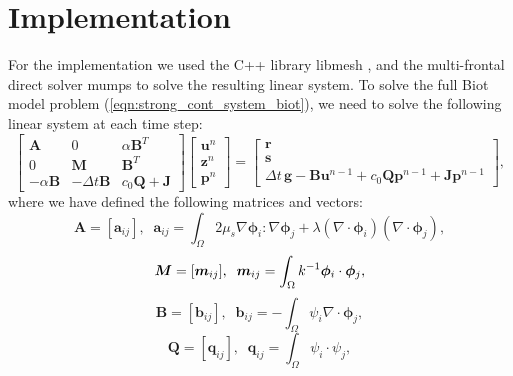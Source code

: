  \section{Implementation}
For the implementation we used the C++ library libmesh \citep{kirk2007libmesh}, and the multi-frontal direct solver mumps \citep{amestoy2000multifrontal} to solve the resulting linear system. To solve the full Biot model problem (\ref{eqn:strong_cont_system_biot}), we need to solve the following linear system at each time step:
 \begin{equation*}
 \begin{bmatrix}
  \mathbf{A} & 0 & \alpha\mathbf{B}^{T} \\
  0 & \mathbf{M} & \mathbf{B}^{T} \\
 - \alpha \mathbf{B} & -\Delta t \mathbf{B} & c_{0}\mathbf{Q} +\mathbf{J}
 \end{bmatrix}
 \begin{bmatrix}
  \mathbf{u}^{n} \\
  \mathbf{z}^{n} \\
 \mathbf{p}^{n}
 \end{bmatrix}=
 \begin{bmatrix}
  \mathbf{r} \\
  \mathbf{s} \\
  \Delta t \, \mathbf{g} - \mathbf{B} \mathbf{u}^{n-1} + c_{0}\mathbf{Q}\mathbf{p}^{n-1} + \mathbf{J} \mathbf{p}^{n-1} 
 \end{bmatrix},
 \end{equation*}
 where we have defined the following matrices and vectors:
 \begin{equation*}
  \mathbf{A}=[\mathbf{a}_{ij}], \;\; \mathbf{a}_{ij}=\int_{\Omega}2\mu_{s} \nabla \mathbf{\phi}_{i} : \nabla\mathbf{\phi}_{j} + \lambda (\nabla\cdot \mathbf{\phi}_{i}) (\nabla\cdot \mathbf{\phi}_{j}),
 \end{equation*}
 \begin{equation*}
  \boldsymbol{M}=[\boldsymbol{m}_{ij}], \;\; \boldsymbol{m}_{ij}=\int_{\Omega}{k^{-1}}  \boldsymbol{\phi}_{i} \cdot \boldsymbol{\phi}_{j}, 
 \end{equation*}
\begin{equation*}
  \mathbf{B}=[\mathbf{b}_{ij}], \;\; \mathbf{b}_{ij}=-\int_{\Omega}  {\psi}_{i} \nabla \cdot \mathbf{\phi}_{j} ,
 \end{equation*}
 \begin{equation*}
  \mathbf{Q}=[\mathbf{q}_{ij}], \;\; \mathbf{q}_{ij}=\int_{\Omega}  {\psi}_{i} \cdot {\psi}_{j}, 
 \end{equation*}
